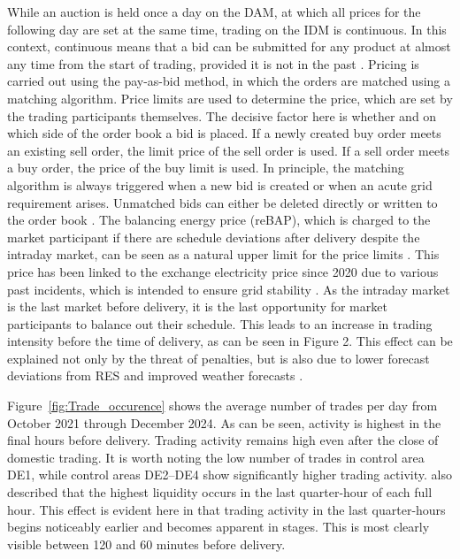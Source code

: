 \documentclass[preprint,12pt,nonatbib]{elsarticle}
\begin{document}
While an auction is held once a day on the DAM, at which all prices for the following day are set at the same time, trading on the IDM is continuous.
In this context, continuous means that a bid can be submitted for any product at almost any time from the start of trading, provided it is not in the past \cite{EPEXSPOT.2021b}.
Pricing is carried out using the pay-as-bid method, in which the orders are matched using a matching algorithm.
Price limits are used to determine the price, which are set by the trading participants themselves.
The decisive factor here is whether and on which side of the order book a bid is placed.
If a newly created buy order meets an existing sell order, the limit price of the sell order is used.
If a sell order meets a buy order, the price of the buy limit is used.
In principle, the matching algorithm is always triggered when a new bid is created or when an acute grid requirement arises.
Unmatched bids can either be deleted directly or written to the order book \cite{EPEXSPOT.2021}.
The balancing energy price (reBAP), which is charged to the market participant if there are schedule deviations after delivery despite the intraday market, can be seen as a natural upper limit for the price limits \cite[84, 158]{Wawer.2022}.
This price has been linked to the exchange electricity price since 2020 due to various past incidents, which is intended to ensure grid stability \cite{TSOGermany.2022}.
As the intraday market is the last market before delivery, it is the last opportunity for market participants to balance out their schedule.
This leads to an increase in trading intensity before the time of delivery, as can be seen in Figure 2.
This effect can be explained not only by the threat of penalties, but is also due to lower forecast deviations from RES and improved weather forecasts \cite{Pape.2018}.

Figure~\ref{fig:Trade_occurence} shows the average number of trades per day from October 2021 through December 2024.
As can be seen, activity is highest in the final hours before delivery.
Trading activity remains high even after the close of domestic trading.
It is worth noting the low number of trades in control area DE1, while control areas DE2–DE4 show significantly higher trading activity.
\cite{puć2024} also described that the highest liquidity occurs in the last quarter-hour of each full hour.
This effect is evident here in that trading activity in the last quarter-hours begins noticeably earlier and becomes apparent in stages.
This is most clearly visible between 120 and 60 minutes before delivery.
\end{document}
